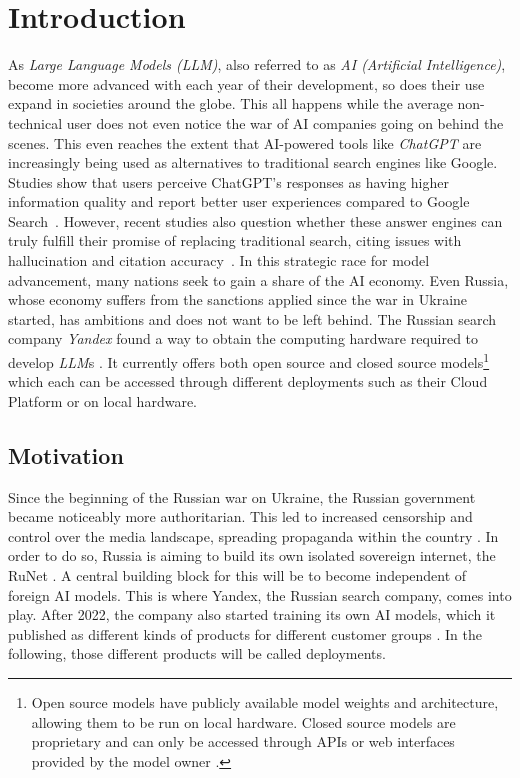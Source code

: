 \chapter{Introduction}\label{chap:introduction}


As \textit{Large Language Models (LLM)}, also referred to as \textit{AI (Artificial Intelligence)}, become more advanced with each year of their development, so does their use expand in societies around the globe. This all happens while the average non-technical user does not even notice the war of AI companies going on behind the scenes. This even reaches the extent that AI-powered tools like \textit{ChatGPT} are increasingly being used as alternatives to traditional search engines like Google. Studies show that users perceive ChatGPT's responses as having higher information quality and report better user experiences compared to Google Search~\cite{xuChatGPTVsGoogle2023b}. However, recent studies also question whether these answer engines can truly fulfill their promise of replacing traditional search, citing issues with hallucination and citation accuracy~\cite{narayananvenkitSearchEnginesAI2025}. In this strategic race for model advancement, many nations seek to gain a share of the AI economy. Even Russia, whose economy suffers from the sanctions applied since the war in Ukraine started, has ambitions and does not want to be left behind. The Russian search company \textit{Yandex} found a way to obtain the computing hardware required to develop \textit{LLM}s \autocite{dobryninDeepSeekRisesRussia12:04:56Z}. It currently offers both open source and closed source models\footnote{Open source models have publicly available model weights and architecture, allowing them to be run on local hardware. Closed source models are proprietary and can only be accessed through APIs or web interfaces provided by the model owner \autocite{kukrejaLiteratureSurveyOpen2024}.} which each can be accessed through different deployments such as their Cloud Platform or on local hardware.

\section{Motivation}

Since the beginning of the Russian war on Ukraine, the Russian government became noticeably more authoritarian. This led to increased censorship and control over the media landscape, spreading propaganda within the country \autocite{fischerRussiaRoadDictatorship}. In order to do so, Russia is aiming to build its own isolated sovereign internet, the RuNet \autocite{martynovaDigitalTransformationRussia2024}. A central building block for this will be to become independent of foreign AI models. This is where Yandex, the Russian search company, comes into play. After 2022, the company also started training its own AI models, which it published as different kinds of products for different customer groups \autocite{YandeksVykladyvaetOtkrytyy}. In the following, those different products will be called deployments.

